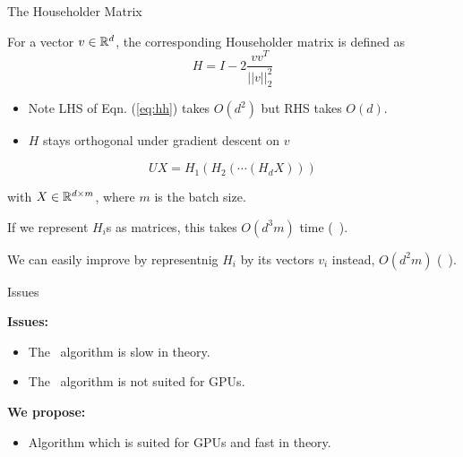 \begin{frame}{The Householder Matrix}
	\begin{definition}
 		For a vector $v \in \mathbb{R}^{d}$, the corresponding Householder matrix
 		is defined as
 		\begin{equation}\label{eq:hh}
 			H = I - 2\frac{v v^T}{||v||^2_2}
 		\end{equation}
	\end{definition}

	\begin{itemize}
		\item Note LHS of Eqn. (\ref{eq:hh}) takes $O(d^2)$ but RHS takes $O(d)$.
		\item $H$ stays orthogonal under gradient descent on $v$
	\end{itemize}

	$$
		UX = H_1 ( H_2 ( \cdots (H_{d} X)))
	$$

	with $X \in \mathbb{R}^{d \times m}$, where $m$ is the batch size.

	If we represent $H_i$s as matrices, this takes $O(d^3m)$ time (\myparallel~\cite{orthhh}).

	We can easily improve by representnig $H_i$ by its vectors $v_i$ instead, $O(d^2m)$ (\mysequential~\cite{orthhh}).
\end{frame}



% 
% 

\begin{frame}{Issues}
	
	\textbf{Issues:}
	\begin{itemize}
		\item The \myparallel~algorithm is slow in theory.
		\item The \mysequential~algorithm is not suited for GPUs.
	\end{itemize}

	\textbf{We propose:}
	\begin{itemize}
		\item Algorithm which is suited for GPUs and fast in theory.
	\end{itemize}

\end{frame}

